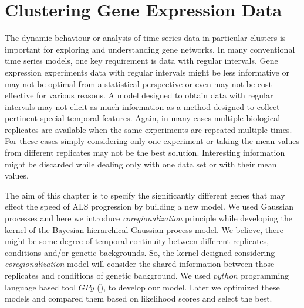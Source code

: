 
\chapter{Clustering Gene Expression Data}\label{ch:Clustering_Gene_Expression_Data}

\ifpdf
    \graphicspath{{Chapter5/Figs/Raster/}{Chapter5/Figs/PDF/}{Chapter5/Figs/}}
\else
    \graphicspath{{Chapter5/Figs/Vector/}{Chapter5/Figs/}}
\fi

The dynamic behaviour or analysis of time series data in particular clusters is important for exploring and understanding gene networks. In many conventional time series models, one key requirement is data with regular intervals. Gene expression experiments data with regular intervals might be less informative or may not be optimal from a statistical perspective or even may not be cost effective for various reasons. A model designed to obtain data with regular intervals may not elicit as much information as a method designed to collect pertinent special temporal features. Again, in many cases multiple biological replicates are available when the same experiments are repeated multiple times. For these cases simply considering only one experiment or taking the mean values from different replicates may not be the best solution. Interesting information might be discarded while dealing only with one data set or with their mean values.

The aim of this chapter is to specify the significantly different genes that may effect the speed of ALS progression by building a new model. We used Gaussian processes and here we introduce  \emph{coregionalization} principle while developing the kernel of the Bayesian hierarchical Gaussian process model. We believe, there might be some degree of temporal continuity between different replicates, conditions and/or genetic backgrounds. So, the kernel designed considering \emph{coregionalization} model will consider the shared information between those replicates and conditions of genetic background. We used $python$ programming language based tool $GPy$ (\cite{gpy2014}), to develop our model. Later we optimized these models and compared them based on likelihood scores and select the best. %

